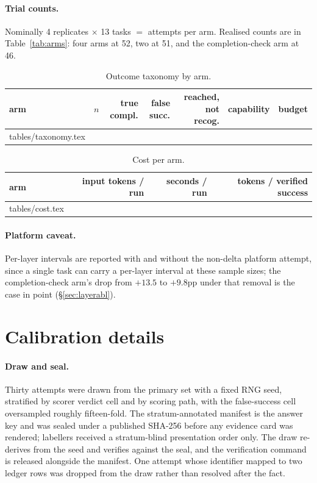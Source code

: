 \documentclass[11pt]{article}
\makeatletter
\newcommand{\inputrows}[1]{\@@input #1 }
\newcommand{\runin}[1]{\paragraph{#1}}
\makeatother
\begin{document}
\runin{Trial counts.}
Nominally 4 replicates $\times$ 13 tasks $=$ \OnN{} attempts per arm.
Realised counts are in Table~\ref{tab:arms}: four arms at 52, two at 51,
and the completion-check arm at 46.

\begin{table}[h]
\centering\small
\setlength{\tabcolsep}{4pt}
\begin{tabular}{@{}lrrrrrr@{}}
\toprule
arm & $n$ & true compl. & false succ. & reached, not recog. &
  capability & budget\\
\midrule
\inputrows{tables/taxonomy.tex}
\bottomrule
\end{tabular}
\caption{Outcome taxonomy by arm.}
\label{tab:taxonomy}
\end{table}

\begin{table}[h]
\centering\small
\begin{tabular}{@{}lrrr@{}}
\toprule
arm & input tokens / run & seconds / run & tokens / verified success\\
\midrule
\inputrows{tables/cost.tex}
\bottomrule
\end{tabular}
\caption{Cost per arm.}
\label{tab:cost}
\end{table}

\runin{Platform caveat.}
Per-layer intervals are reported with and without the non-delta platform
attempt, since a single task can carry a per-layer interval at these
sample sizes; the completion-check arm's drop from $+13.5$ to $+9.8$pp
under that removal is the case in point (\S\ref{sec:layerabl}).

\section{Calibration details}
\label{app:calib}

\runin{Draw and seal.}
Thirty attempts were drawn from the primary set with a fixed RNG seed,
stratified by scorer verdict cell and by scoring path, with the
false-success cell oversampled roughly fifteen-fold. The
stratum-annotated manifest is the answer key and was sealed under a
published SHA-256 before any evidence card was rendered; labellers
received a stratum-blind presentation order only. The draw re-derives
from the seed and verifies against the seal, and the verification
command is released alongside the manifest. One attempt whose identifier
mapped to two ledger rows was dropped from the draw rather than resolved
after the fact.
\end{document}
